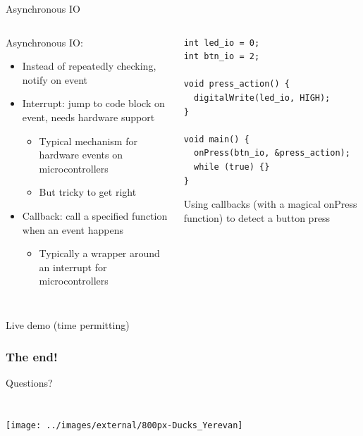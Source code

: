 \documentclass{beamer}
\begin{document}
\begin{frame}[fragile]{Asynchronous IO}
  \begin{columns}[T]
    \begin{column}{.6\textwidth}
      Asynchronous IO:
      \begin{itemize}
        \item Instead of repeatedly checking, notify on event
        \item Interrupt: jump to code block on event, needs hardware support
        \begin{itemize}
          \item Typical mechanism for hardware events on microcontrollers
          \item But tricky to get right
        \end{itemize}
        \item Callback: call a specified function when an event happens
        \begin{itemize}
          \item Typically a wrapper around an interrupt for microcontrollers
        \end{itemize}
      \end{itemize}
    \end{column}

    \begin{column}{0.4\textwidth}
\begin{lstlisting}[tabsize=2,basicstyle=\ttfamily\scriptsize]
int led_io = 0;
int btn_io = 2;

void press_action() {
  digitalWrite(led_io, HIGH);
}

void main() {
  onPress(btn_io, &press_action);
  while (true) {}
} \end{lstlisting}
Using callbacks (with a magical onPress function) to detect a button press
    \end{column}
  \end{columns}
\end{frame}

\subsection{}
\begin{frame}{Live demo (time permitting)}
\end{frame}

\begin{frame}[plain]
\frametitle{The end!} \centering
  Questions? \\
  ~ \\
  ~ \\
  \texttt{[image: ../images/external/800px-Ducks\_Yerevan]}
\end{frame}
\end{document}
